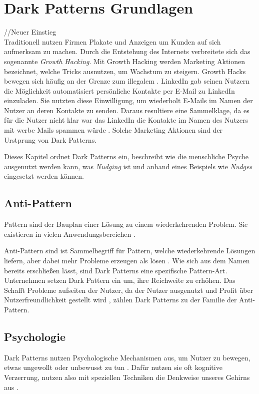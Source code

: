 \documentclass[conference,compsoc,final,a4paper]{IEEEtran}
\begin{document}
\section{Dark Patterns Grundlagen}
//Neuer Einstieg\\

Traditionell nutzen Firmen Plakate und Anzeigen um Kunden auf sich aufmerksam zu machen. Durch die Entstehung des Internets verbreitete sich das sogenannte \textit{Growth Hacking}. Mit Growth Hacking werden Marketing Aktionen bezeichnet, welche Tricks ausnutzen, um Wachstum zu steigern. Growth Hacks bewegen sich häufig an der Grenze zum illegalem  \autocite{Narayanan2020}. LinkedIn gab seinen Nutzern die Möglichkeit automatisiert persönliche Kontakte per E-Mail zu LinkedIn einzuladen. Sie nutzten diese Einwilligung, um wiederholt E-Mails im Namen der Nutzer an deren Kontakte zu senden. Daraus resultiere eine Sammelklage, da es für die Nutzer nicht klar war das LinkedIn die Kontakte im Namen des Nutzers mit werbe Mails spammen würde \autocite{Strange2015}. Solche Marketing Aktionen sind der Urstprung von Dark Patterns. 

Dieses Kapitel ordnet Dark Patterns ein, beschreibt wie die menschliche Psyche ausgenutzt werden kann, was \textit{Nudging} ist und anhand eines Beispiels wie \textit{Nudges} eingesetzt werden können.
\subsection{Anti-Pattern}
Pattern sind der Bauplan einer Lösung zu einem wiederkehrenden Problem. Sie existieren in vielen Anwendungsbereichen \autocite[S. 1]{MacDonald2019}.

Anti-Pattern sind ist Sammelbegriff für Pattern, welche wiederkehrende Lösungen liefern, aber dabei mehr Probleme erzeugen als lösen \autocite[S. 193-195]{MacDonald2019}. Wie sich aus dem Namen bereits erschließen lässt, sind Dark Patterns eine spezifische Pattern-Art.
Unternehmen setzen Dark Pattern ein um, ihre Reichweite zu erhöhen. Das Schafft Probleme aufseiten der Nutzer, da der Nutzer ausgenutzt und Profit über Nutzerfreundlichkeit gestellt wird \autocite{Chivukula_2019}, zählen Dark Patterns zu der Familie der Anti-Pattern.
\subsection{Psychologie}
\label{chap:Psychologie}
Dark Patterns nutzen Psychologische Mechanismen aus, um Nutzer zu bewegen, etwas ungewollt oder unbewusst zu tun \autocite{Brignull}. Dafür nutzen sie oft kognitive Verzerrung, nutzen also mit speziellen Techniken die Denkweise unseres Gehirns aus \autocite{Mathur2019}.
\end{document}
